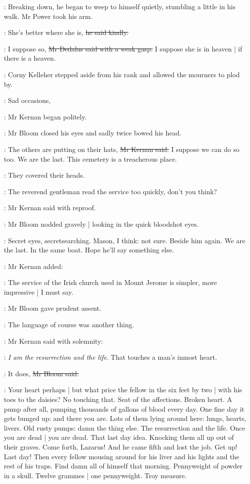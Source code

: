 :
Breaking down, he began to weep to himself quietly,
stumbling a little in his walk.
Mr Power took his arm.

\power:
She's better where she is,
\sout{he said kindly.}

\simon:
I suppose so,
\sout{Mr Dedalus said with a weak gasp.}
I suppose she is in heaven |
if there is a heaven.

:
Corny Kelleher stepped aside from his rank and allowed the mourners to plod by.

:
Sad occasions,

:
Mr Kernan began politely.

:
Mr Bloom closed his eyes and sadly twice bowed his head.

:
The others are putting on their hats,
\sout{Mr Kernan said.}
I suppose we can do so too.
We are the last.
This cemetery is a treacherous place.

:
They covered their heads.

:
The reverend gentleman read the service too quickly, don't you think?

:
Mr Kernan said with reproof.

:
Mr Bloom nodded gravely |
looking in the quick bloodshot eyes.

\BloomInt:
Secret eyes, secretsearching.
Mason, I think:
not sure.
Beside him again.
We are the last.
In the same boat.
Hope he'll say something else.

:
Mr Kernan added:

:
The service of the Irish church used in Mount Jerome
is simpler, more impressive |
I must say.

:
Mr Bloom gave prudent assent.

\BloomInt:
The language of course was another thing.

:
Mr Kernan said with solemnity:

:
\emph{I am the resurrection and the life}.
That touches a man's inmost heart.

\Bloom:
It does,
\sout{Mr Bloom said.}

\BloomInt:
Your heart perhaps |
but what price the fellow
in the six feet by two |
with his toes to the daisies?
No touching that.
Seat of the affections.
Broken heart.
A pump after all, pumping thousands of gallons of blood every day.
One fine day it gets bunged up:
and there you are.
Lots of them lying around here:
lungs, hearts, livers.
Old rusty pumps:
damn the thing else.
The resurrection and the life.
Once you are dead |
you are dead.
That last day idea.
Knocking them all up out of their graves.
Come forth, Lazarus!
And he came fifth and lost the job.
Get up!
Last day!
Then every fellow mousing around for his liver and his lights
and the rest of his traps.
Find damn all of himself that morning.
Pennyweight of powder in a skull.
Twelve grammes |
one pennyweight.
Troy measure.

